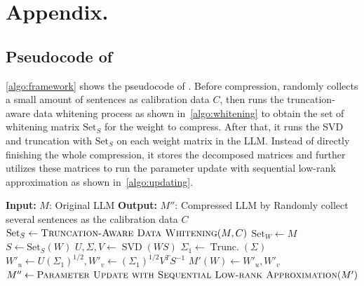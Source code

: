 \newpage
\appendix
\onecolumn
\section{Appendix.}
\subsection{Pseudocode of \sysname}
\label{appendix:pseudocode}
\cref{algo:framework} shows the pseudocode of \sysname. Before compression, \sysname randomly collects a small amount of sentences as calibration data $C$, then runs the truncation-aware data whitening process as shown in~\cref{algo:whitening} to obtain the set of whitening matrix $\text{Set}_S$ for the weight to compress. After that, it runs the SVD and truncation with $\text{Set}_S$ on each weight matrix in the LLM. Instead of directly finishing the whole compression, it stores the decomposed matrices and further utilizes these matrices to run the parameter update with sequential low-rank approximation as shown in~\cref{algo:updating}.

\begin{algorithm}[ht]
\caption{Pseudocode of \sysname}
\begin{algorithmic}[1] %
\State \textbf{Input:} $M$: Original LLM
\State \textbf{Output:} $M''$: Compressed LLM by \sysname
{} %
    \State Randomly collect several sentences as the calibration data $C$
    \State $\text{Set}_S \gets \textproc{Truncation-Aware Data Whitening}(M, C)$
    \State $\text{Set}_W \gets M$  
        \State $S \gets \text{Set}_S(W)$   
        \State $U, \Sigma, V \gets \operatorname{SVD}(WS)$   
        \State $\Sigma_1 \gets \operatorname{Trunc.}(\Sigma)$  
        \State $W'_u \gets U(\Sigma_1)^{1/2}, W'_v \gets (\Sigma_1)^{1/2}V^TS^{-1}$ 
        \State $M'(W) \gets W'_u, W'_v$      
    \EndFor
    \State $M'' \gets \textproc{Parameter Update with Sequential Low-rank Approximation}(M')$
     \State {}
\EndProcedure
\end{algorithmic}
\label{algo:framework}
\end{algorithm}

